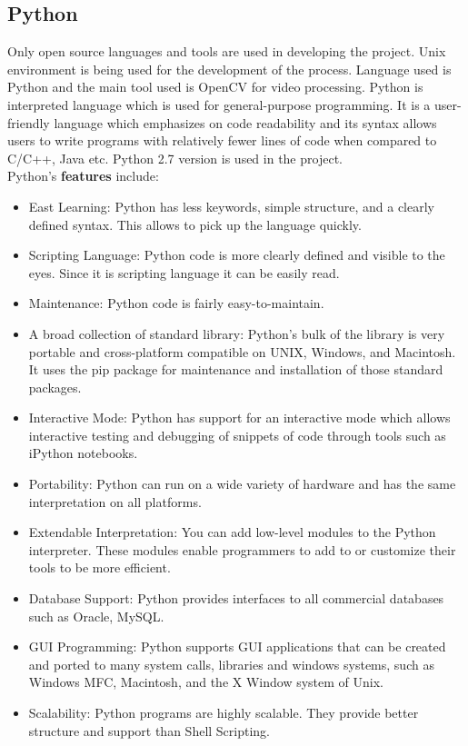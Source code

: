 \subsection{Python}
Only open source languages and tools are used in developing the project. Unix environment is being used for the development of the process.
Language used is Python and the main tool used is OpenCV for video processing. Python is interpreted language which is used for general-purpose programming. It is a user-friendly language which emphasizes on code readability and its syntax allows users to write programs with relatively fewer lines of code when compared to C/C++, Java etc. Python 2.7 version is used in the project.\\
Python's \textbf{features} include:
\begin{itemize}
\item East Learning: Python has less keywords, simple structure, and a clearly defined syntax. This allows to pick up the language quickly.
\item Scripting Language: Python code is more clearly defined and visible to the eyes. Since it is scripting language it can be easily read.
\item Maintenance: Python code is fairly easy-to-maintain.
\item A broad collection of standard library: Python's bulk of the library is very portable and cross-platform compatible on UNIX, Windows, and Macintosh. It uses the pip package for maintenance and installation of those standard packages.
\item Interactive Mode: Python has support for an interactive mode which allows interactive testing and debugging of snippets of code through tools such as iPython notebooks.
\item Portability: Python can run on a wide variety of hardware and has the same interpretation on all platforms.
\item Extendable Interpretation: You can add low-level modules to the Python interpreter. These modules enable programmers to add to or customize their tools to be more efficient.
\item Database Support: Python provides interfaces to all commercial databases such as Oracle, MySQL.
\item GUI Programming: Python supports GUI applications that can be created and ported to many system calls, libraries and windows systems, such as Windows MFC, Macintosh, and the X Window system of Unix.
\item Scalability: Python programs are highly scalable. They provide better structure and support than Shell Scripting.
\end{itemize}
